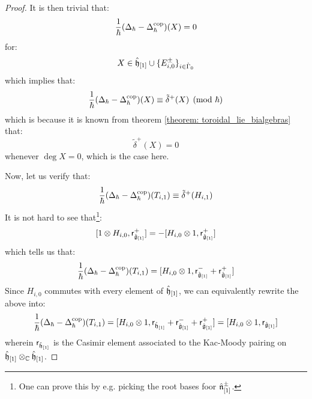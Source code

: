 \begin{proof}
                It is then trivial that:
                    $$\frac{1}{\hbar}( \Delta_{\hbar} - \Delta_{\hbar}^{\mathrm{cop}} )(X) = 0$$
                for:
                    $$X \in \hat{\mathfrak{h}}_{[1]} \cup \{E_{i, 0}^{\pm}\}_{i \in \hat{\Gamma}_0}$$
                which implies that:
                    $$\frac{1}{\hbar}( \Delta_{\hbar} - \Delta_{\hbar}^{\mathrm{cop}} )(X) \equiv \tilde{\delta}^+(X) \pmod{\hbar}$$
                which is because it is known from theorem \ref{theorem: toroidal_lie_bialgebras} that:
                    $$\tilde{\delta}^+(X) = 0$$
                whenever $\deg X = 0$, which is the case here.
                
                Now, let us verify that:
                    $$\frac{1}{\hbar}(\Delta_{\hbar} - \Delta_{\hbar}^{\mathrm{cop}})(T_{i, 1}) \equiv \tilde{\delta}^+(H_{i, 1})$$
                It is not hard to see that\footnote{One can prove this by e.g. picking the root bases foor $\hat{\mathfrak{n}}_{[1]}^{\pm}$.}:
                    $$[1 \tensor H_{i, 0}, \sfr_{ \hat{\g}_{[1]} }^+] = -[H_{i, 0} \tensor 1, \sfr_{ \hat{\g}_{[1]} }^+]$$
                which tells us that:
                    $$\frac{1}{\hbar}( \Delta_{\hbar} - \Delta_{\hbar}^{\cop} )(T_{i, 1}) = [H_{i, 0} \tensor 1, \sfr_{ \hat{\g}_{[1]} }^- + \sfr_{ \hat{\g}_{[1]} }^+]$$
                Since $H_{i, 0}$ commutes with every element of $\hat{\mathfrak{h}}_{[1]}$, we can equivalently rewrite the above into:
                    $$\frac{1}{\hbar}( \Delta_{\hbar} - \Delta_{\hbar}^{\cop} )(T_{i, 1}) = [H_{i, 0} \tensor 1, \sfr_{\hat{\h}_{[1]}} + \sfr_{ \hat{\g}_{[1]} }^- + \sfr_{ \hat{\g}_{[1]} }^+] = [H_{i, 0} \tensor 1, \sfr_{ \hat{\g}_{[1]} }]$$
                wherein $\mathsf{r}_{\hat{\mathfrak{h}}_{[1]}}$ is the Casimir element associated to the Kac-Moody pairing on $\hat{\h}_{[1]} \tensor_{\bbC} \hat{\h}_{[1]}$. 


\end{proof}
